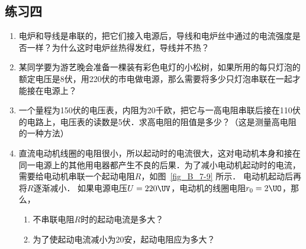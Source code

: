 \subsection*{练习四}
\begin{enumerate}
    \item 电炉和导线是串联的，把它们接入电源后，导线和电炉丝中通过的电流强度是否一样？为什么这时电炉丝热得发红，导线并不热？
    \item 某同学要为游艺晚会准备一棵装有彩色电灯的小松树，如果所用的每只灯泡的额定电压是8伏，用220伏的市电做电源，那么需要将多少只灯泡串联在一起才能接在电源上？
    \item 一个量程为150伏的电压表，内阻为20千欧，把它与一高电阻串联后接在110伏的电路上，电压表的读数是5伏．求高电阻的阻值是多少？（这是测量高电阻的一种方法）
    \item 直流电动机线圈的电阻很小，所以起动时的电流很大，这对电动机本身和接在同一电源上的其他用电器都产生不良的后果．为了减小电动机起动时的电流，需要给电动机串联一个起动电阻$R$，如图~\ref{fig_B_7-9} 所示．
    电动机起动后再将$R$逐渐减小．
    如果电源电压$U=220 \UV$，电动机的线圈电阻$r_0=2\UO$，那么，
    \begin{enumerate}
        \item 不串联电阻$R$时的起动电流是多大？
        \item 为了使起动电流减小为20安，起动电阻应为多大？
    \end{enumerate}
    

\end{enumerate}
